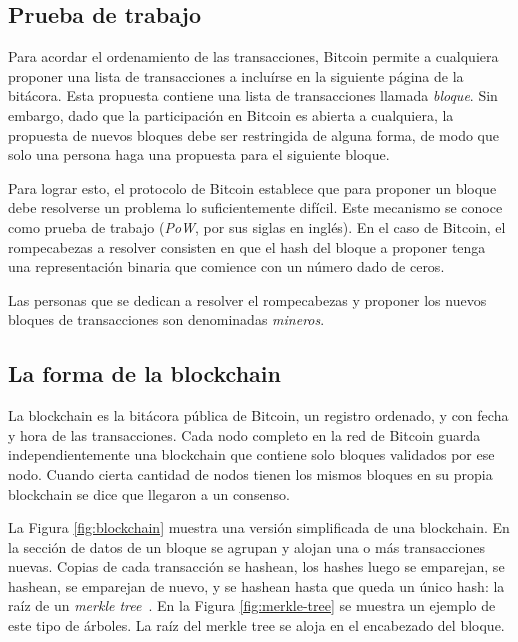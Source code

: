  \subsection{Prueba de trabajo}

 Para acordar el ordenamiento de las transacciones, Bitcoin permite a cualquiera proponer una lista
 de transacciones a incluírse en la siguiente página de la bitácora.
 Esta propuesta contiene una lista de transacciones llamada \textit{bloque}.
 Sin embargo, dado que la participación en Bitcoin es abierta a cualquiera, la propuesta de nuevos
 bloques debe ser restringida de alguna forma, de modo que solo una persona haga una propuesta
 para el siguiente bloque.

Para lograr esto, el protocolo de Bitcoin establece que para proponer un bloque debe resolverse
un problema lo suficientemente difícil.
%
Este mecanismo se conoce como prueba de trabajo (\textit{PoW}, por sus siglas en inglés).
%
En el caso de Bitcoin, el rompecabezas a resolver consisten en que el hash del bloque a proponer
tenga una representación binaria que comience con un número dado de ceros.

%
Las personas que se dedican a resolver el rompecabezas y proponer los nuevos bloques de transacciones
son denominadas \textit{mineros}.

\subsection{La forma de la blockchain}

La blockchain es la bitácora pública de Bitcoin, un registro ordenado, y con fecha y hora de las transacciones.
%
Cada nodo completo en la red de Bitcoin guarda independientemente una blockchain que contiene solo
bloques validados por ese nodo.
%
Cuando cierta cantidad de nodos tienen los mismos bloques en su propia blockchain
se dice que llegaron a un consenso. 

La Figura \ref{fig:blockchain} muestra una versión simplificada de una blockchain.
En la sección de datos de un bloque
se agrupan y alojan una o más transacciones nuevas. Copias de cada transacción se hashean, los hashes luego
se emparejan, se hashean, se emparejan de nuevo, y se hashean hasta que queda un único hash: la raíz de un
\textit{merkle tree}~\cite{merkle.tree}. 
En la Figura \ref{fig:merkle-tree} se muestra un ejemplo de este tipo de árboles.
La raíz del merkle tree se aloja en el encabezado del bloque.

